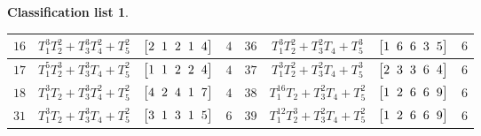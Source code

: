 \documentclass[pdftex]{sigma}%
\theoremstyle{definition}
\newtheorem{class-list}[thm]{Classification list}
\numberwithin{equation}{section}
\begin{document}
\begin{class-list}
\begin{table}[h!]
\begin{tabu}{c|c|c|c||c|c|c|c}
${16}$&${T_{1}^{3}T_{2}^{2}+T_{3}^{3}T_{4}^{2}+T_{5}^{2}}$
&$\arraycolsep=1mm\begin{bmatrix}{2} & {1} & {2} & {1} & {4}\end{bmatrix}$&${4}$
&${36}$&${T_{1}^{3}T_{2}^{2}+T_{3}^{2}T_{4}+T_{5}^{3}}$
&$\arraycolsep=1mm\begin{bmatrix}{1} & {6} & {6} & {3} & {5}\end{bmatrix}$&${6}$
\\
\hline
${17}$&${T_{1}^{5}T_{2}^{3}+T_{3}^{3}T_{4}+T_{5}^{2}}$
&$\arraycolsep=1mm\begin{bmatrix}{1} & {1} & {2} & {2} & {4}\end{bmatrix}$&${4}$
&${37}$&${T_{1}^{3}T_{2}^{2}+T_{3}^{2}T_{4}+T_{5}^{3}}$
&$\arraycolsep=1mm\begin{bmatrix}{2} & {3} & {3} & {6} & {4}\end{bmatrix}$&${6}$
\\
\hline
${18}$&${T_{1}^{3}T_{2}+T_{3}^{3}T_{4}^{2}+T_{5}^{2}}$
&$\arraycolsep=1mm\begin{bmatrix}{4} & {2} & {4} & {1} & {7}\end{bmatrix}$&${4}$
&${38}$&${T_{1}^{16}T_{2}+T_{3}^{2}T_{4}+T_{5}^{2}}$
&$\arraycolsep=1mm\begin{bmatrix}{1} & {2} & {6} & {6} & {9}\end{bmatrix}$&${6}$
\\
\hline
${31}$&${T_{1}^{3}T_{2}+T_{3}^{3}T_{4}+T_{5}^{2}}$
&$\arraycolsep=1mm\begin{bmatrix}{3} & {1} & {3} & {1} & {5}\end{bmatrix}$&${6}$
&${39}$&${T_{1}^{12}T_{2}^{3}+T_{3}^{2}T_{4}+T_{5}^{2}}$
&$\arraycolsep=1mm\begin{bmatrix}{1} & {2} & {6} & {6} & {9}\end{bmatrix}$&${6}$
\\
\hline
\end{tabu}
\end{table}


\end{class-list}
\end{document}
